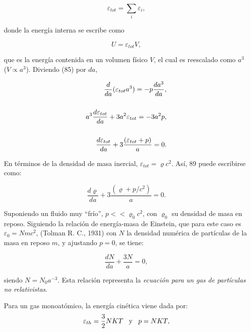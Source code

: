 \documentclass{article}
\begin{document}
  \begin{equation}
      \varepsilon_{tot} = \sum_i \varepsilon_i,
  \end{equation}
    
    donde la energía interna se escribe como 
    
    \begin{equation}
        U = \varepsilon_{tot} V,
    \end{equation}
    
    que es la energía contenida en un volumen físico $V$, el cual es reescalado como $a^3$ ($V \propto a^3$). 
    Diviendo (85) por $da$,
    
    \begin{align}
        \frac{d}{da}( \varepsilon_{tot} a^3)  = -p \frac{da^3}{da}, \\
        \notag \\
        a^3 \frac{d\varepsilon_{tot}}{da} + 3 a^2 \varepsilon_{tot} = - 3 a^2p,     \notag \\
        \notag \\
        \frac{d\varepsilon_{tot}}{da}+ 3 \frac{( \varepsilon_{tot} + p)}{a}  = 0.
    \end{align}
    
    En términos de la densidad de masa inercial, $\varepsilon_{tot}= \varrho c^2$. Así, 89 puede escribirse como: 
    
    \begin{equation}
         \frac{d\varrho}{da} + 3 \frac{(\varrho + p/c^2)}{a} = 0.
    \end{equation}
    
    Suponiendo un fluido muy ``frío'', $p << \varrho_0 c^2$, con $\varrho_0$ su densidad de masa en reposo. Siguiendo la relación de energía-masa de Einstein, que para este caso es $\varepsilon_0 =Nm c^2$, (Tolman R. C., 1931) con $N$ la densidad numérica de partículas de la masa en reposo $m$, y ajustando $p=0$, se tiene: 
    
    \begin{equation}
        \frac{dN}{da} + \frac{3N}{a} = 0, 
    \end{equation}
    
    siendo $N = N_0 a^{-3}$. Esta relación representa la {\textit{ecuación para un gas de partículas no relativistas}}. 
    
    Para un gas monoatómico, la energía cinética viene dada por: $$\varepsilon_{th} = \frac{3}{2} NKT  \hspace{0.3cm} \text{y} \hspace{0.3cm} p = NKT,$$
    
\end{document}
